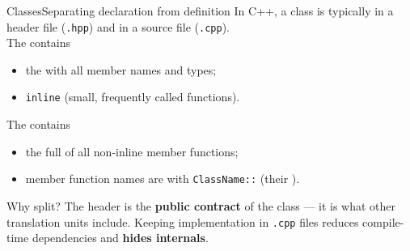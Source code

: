 \begin{frame}{Classes}{Separating declaration from definition}
	\justifying
	In C++, a class is typically  in a header file (\texttt{.hpp}) and  in a source file (\texttt{.cpp}).\\
	\bigskip
	The  contains
	\begin{itemize}
		\item the  with all member names and types;
		\item \texttt{inline}  (small, frequently called functions).
	\end{itemize}
	\bigskip
	The  contains
	\begin{itemize}
		\item the full  of all non-inline member functions;
		\item member function names are  with \texttt{ClassName::} (their ).
	\end{itemize}
	\bigskip
	\begin{block}{Why split?}
		\justifying
		The header is the \textbf{public contract} of the class — it is what other translation units include.
		Keeping implementation in \texttt{.cpp} files reduces compile-time dependencies and \textbf{hides internals}.
	\end{block}
\end{frame}
